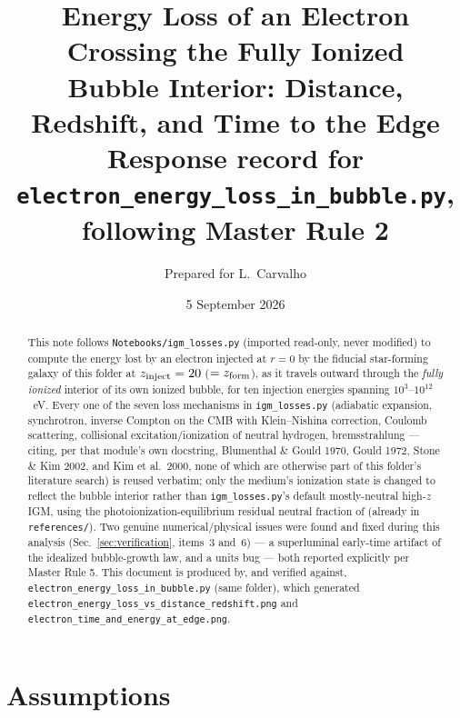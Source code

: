 \documentclass[11pt,a4paper]{article}
\title{\bf Energy Loss of an Electron Crossing the Fully Ionized\\ Bubble Interior: Distance, Redshift, and Time to the Edge\\[2mm]
\large Response record for \texttt{electron\_energy\_loss\_in\_bubble.py}, following Master Rule 2}
\author{Prepared for L.\ Carvalho}
\date{5 September 2026}
\begin{document}
\maketitle

\begin{abstract}
\noindent
This note follows \texttt{Notebooks/igm\_losses.py} (imported read-only, never modified) to compute the
energy lost by an electron injected at $r=0$ by the fiducial star-forming galaxy of this folder at
$z_{\rm inject}=20$ ($=z_{\rm form}$), as it travels outward through the \emph{fully ionized} interior of
its own ionized bubble, for ten injection energies spanning $10^3$--$10^{12}$~eV. Every one of the seven
loss mechanisms in \texttt{igm\_losses.py} (adiabatic expansion, synchrotron, inverse Compton on the CMB
with Klein--Nishina correction, Coulomb scattering, collisional excitation/ionization of neutral hydrogen,
bremsstrahlung --- citing, per that module's own docstring, Blumenthal \& Gould 1970, Gould 1972, Stone \&
Kim 2002, and Kim et al.\ 2000, none of which are otherwise part of this folder's literature search) is
reused verbatim; only the medium's ionization state is changed to reflect the bubble interior rather than
\texttt{igm\_losses.py}'s default mostly-neutral high-$z$ IGM, using the photoionization-equilibrium residual
neutral fraction of \citet{Cen2000} (already in \texttt{references/}). Two genuine numerical/physical issues were
found and fixed during this analysis (Sec.~\ref{sec:verification}, items~3 and~6) --- a superluminal
early-time artifact of the idealized bubble-growth law, and a units bug --- both reported explicitly per
Master Rule 5. This document is produced by, and verified against,
\texttt{electron\_energy\_loss\_in\_bubble.py} (same folder), which generated
\texttt{electron\_energy\_loss\_vs\_distance\_redshift.png} and \texttt{electron\_time\_and\_energy\_at\_edge.png}.
\end{abstract}

\tableofcontents

\section{Assumptions}
\label{sec:assumptions}
\end{document}
